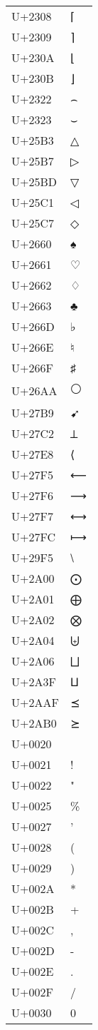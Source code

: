 \documentclass{article}
\begin{document}
\begin{longtable}{ll}
U+2308 & ⌈ \\
U+2309 & ⌉ \\
U+230A & ⌊ \\
U+230B & ⌋ \\
U+2322 & ⌢ \\
U+2323 & ⌣ \\
U+25B3 & △ \\
U+25B7 & ▷ \\
U+25BD & ▽ \\
U+25C1 & ◁ \\
U+25C7 & ◇ \\
U+2660 & ♠ \\
U+2661 & ♡ \\
U+2662 & ♢ \\
U+2663 & ♣ \\
U+266D & ♭ \\
U+266E & ♮ \\
U+266F & ♯ \\
U+26AA & ⚪ \\
U+27B9 & ➹ \\
U+27C2 & ⟂ \\
U+27E8 & ⟨ \\
U+27F5 & ⟵ \\
U+27F6 & ⟶ \\
U+27F7 & ⟷ \\
U+27FC & ⟼ \\
U+29F5 & ⧵ \\
U+2A00 & ⨀ \\
U+2A01 & ⨁ \\
U+2A02 & ⨂ \\
U+2A04 & ⨄ \\
U+2A06 & ⨆ \\
U+2A3F & ⨿ \\
U+2AAF & ⪯ \\
U+2AB0 & ⪰ \\
U+0020 &   \\
U+0021 & ! \\
U+0022 & " \\
U+0025 & \% \\
U+0027 & ' \\
U+0028 & ( \\
U+0029 & ) \\
U+002A & * \\
U+002B & + \\
U+002C & , \\
U+002D & - \\
U+002E & . \\
U+002F & / \\
U+0030 & 0 \\

\end{longtable}
\end{document}
